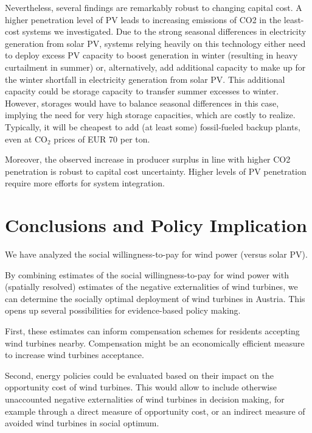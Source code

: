 \documentclass[final, 3p, times]{elsarticle} %
\newcommand{\COO}{\ensuremath{\mathrm{CO_2}} }
\begin{document}
    Nevertheless, several findings are remarkably robust to changing capital cost.
    A higher penetration level of PV leads to increasing emissions of CO2 in the least-cost systems we investigated.
    Due to the strong seasonal differences in electricity generation from solar PV, systems relying heavily on this technology either need to deploy excess PV capacity to boost generation in winter (resulting in heavy curtailment in summer) or, alternatively, add additional capacity to make up for the winter shortfall in electricity generation from solar PV.
    This additional capacity could be storage capacity to transfer summer excesses to winter.
    However, storages would have to balance seasonal differences in this case, implying the need for very high storage capacities, which are costly to realize.
    Typically, it will be cheapest to add (at least some) fossil-fueled backup plants, even at \COO prices of EUR 70 per ton.

    Moreover, the observed increase in producer surplus in line with higher CO2 penetration is robust to capital cost uncertainty.
    Higher levels of PV penetration require more efforts for system integration.


    \section{Conclusions and Policy Implication} \label{sec:conclusions-policy-implication}
    We have analyzed the social willingness-to-pay for wind power (versus solar PV).

    By combining estimates of the social willingness-to-pay for wind power with (spatially resolved) estimates of the negative externalities of wind turbines, we can determine the socially optimal deployment of wind turbines in Austria.
    This opens up several possibilities for evidence-based policy making.

    First, these estimates can inform compensation schemes for residents accepting wind turbines nearby.
    Compensation might be an economically efficient measure to increase wind turbines acceptance.

    Second, energy policies could be evaluated based on their impact on the opportunity cost of wind turbines.
    This would allow to include otherwise unaccounted negative externalities of wind turbines in decision making, for example through a direct measure of opportunity cost, or an indirect measure of avoided wind turbines in social optimum.
\end{document}
